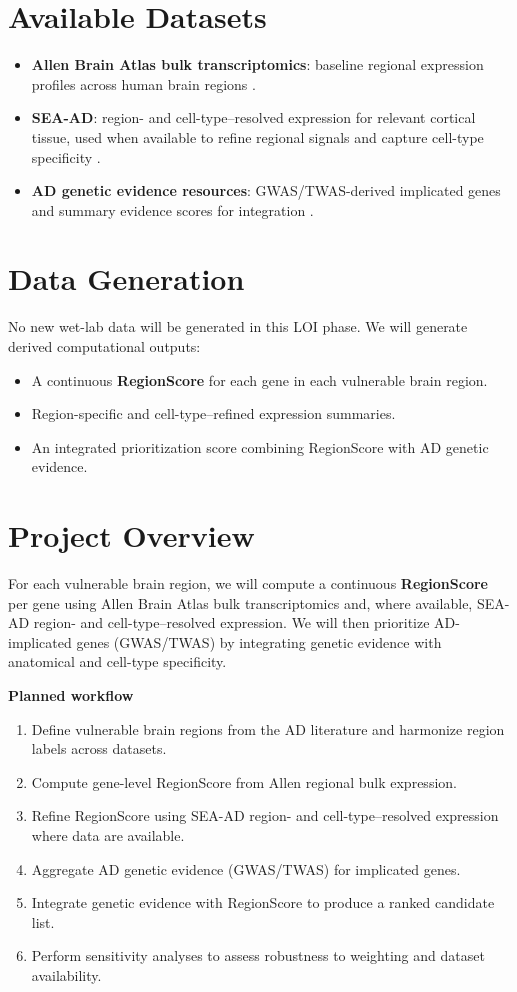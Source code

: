 \documentclass{article}
\begin{document}
\section{Available Datasets}
\begin{itemize}
\item \textbf{Allen Brain Atlas bulk transcriptomics}: baseline regional expression profiles across human brain regions \cite{allenAtlas2012}.
\item \textbf{SEA-AD}: region- and cell-type--resolved expression for relevant cortical tissue, used when available to refine regional signals and capture cell-type specificity \cite{seaad2024, seaadPreprint2025}.
\item \textbf{AD genetic evidence resources}: GWAS/TWAS-derived implicated genes and summary evidence scores for integration \cite{lambert2013, adGwas2025}.
\end{itemize}

\section{Data Generation}
No new wet-lab data will be generated in this LOI phase. We will generate derived computational outputs:
\begin{itemize}
\item A continuous \textbf{RegionScore} for each gene in each vulnerable brain region.
\item Region-specific and cell-type--refined expression summaries.
\item An integrated prioritization score combining RegionScore with AD genetic evidence.
\end{itemize}

\section{Project Overview}

For each vulnerable brain region, we will compute a continuous \textbf{RegionScore} per gene using Allen Brain Atlas bulk transcriptomics and, where available, SEA-AD region- and cell-type--resolved expression. We will then prioritize AD-implicated genes (GWAS/TWAS) by integrating genetic evidence with anatomical and cell-type specificity.

\textbf{Planned workflow}
\begin{enumerate}
\item Define vulnerable brain regions from the AD literature and harmonize region labels across datasets.
\item Compute gene-level RegionScore from Allen regional bulk expression.
\item Refine RegionScore using SEA-AD region- and cell-type--resolved expression where data are available.
\item Aggregate AD genetic evidence (GWAS/TWAS) for implicated genes.
\item Integrate genetic evidence with RegionScore to produce a ranked candidate list.
\item Perform sensitivity analyses to assess robustness to weighting and dataset availability.
\end{enumerate}
\end{document}
